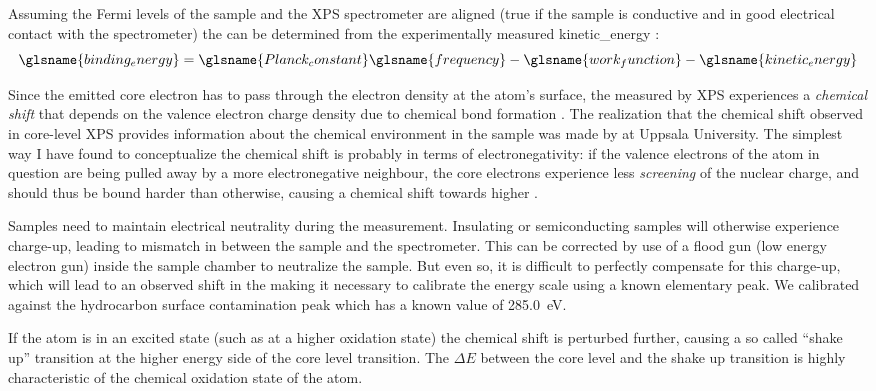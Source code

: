 \documentclass[draft,webedition,openright,titles,swedish,english]{LuaUUThesis}\usepackage[]{graphicx}\usepackage[]{xcolor}
\begin{document}
Assuming the Fermi levels of the sample and the \gls{XPS} spectrometer
are aligned (true if the sample is conductive and in good electrical contact with the spectrometer)
the  can be determined from the experimentally measured
\gls{kinetic_energy} \cite{Greczynski2023}:
\begin{equation}
\glsname{binding_energy} =
\glsname{Planck_constant}\glsname{frequency} - \glsname{work_function} - \glsname{kinetic_energy}
\end{equation}

Since the emitted core electron has to pass through the electron density
at the atom's surface, the  measured by \gls{XPS}
experiences a \emph{chemical shift} that depends on the valence electron charge density
due to chemical bond formation \cite{Greczynski2023}.
The realization that the chemical shift observed in core-level \gls{XPS}
provides information about the chemical environment in the sample
was made by \textcite{Siegbahn1968} at Uppsala University.
The simplest way I have found to conceptualize the chemical shift is probably in terms of
electronegativity: if the valence electrons of the atom in question are being
pulled away by a more electronegative neighbour, the core electrons experience
less \emph{screening} of the nuclear charge, and should thus be bound harder
than otherwise, causing a chemical shift towards higher .

Samples need to maintain electrical neutrality during the measurement.
Insulating or semiconducting samples will otherwise experience charge-up, leading to
mismatch in  between the sample and the spectrometer.
This can be corrected by use of a flood gun (low energy electron gun)
inside the sample chamber to neutralize the sample.
But even so, it is difficult to perfectly compensate for this charge-up, which
will lead to an observed shift in the  making it
necessary to calibrate the energy scale using a known elementary peak.
We calibrated against the hydrocarbon surface contamination peak
 which has a known value of \qty{285.0}{\eV}.

If the atom is in an excited state (such as at a higher oxidation state)
the chemical shift is perturbed further, causing a so called \enquote{shake up}
transition at the higher energy side of the core level transition.
The $\Delta E$ between the core level and the shake up transition is highly
characteristic of the chemical oxidation state of the atom.
\end{document}
